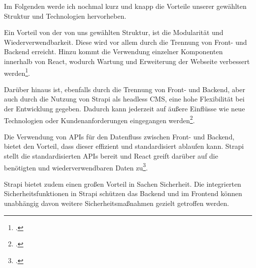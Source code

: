 Im Folgenden werde ich nochmal kurz und knapp die Vorteile unserer gewählten Struktur und Technologien hervorheben.

Ein Vorteil von der von uns gewählten Struktur, ist die Modularität und Wiederverwendbarkeit. Diese wird vor allem durch die Trennung von Front- und Backend erreicht. Hinzu kommt die Verwendung einzelner Komponenten innerhalb von React, wodurch Wartung und Erweiterung der Webseite verbessert werden\footcite{acharya_15_2023}.

Darüber hinaus ist, ebenfalls durch die Trennung von Front- und Backend, aber auch durch die Nutzung von Strapi als headless CMS, eine hohe Flexibilität bei der Entwicklung gegeben. Dadurch kann jederzeit auf äußere Einflüsse wie neue Technologien oder Kundenanforderungen eingegangen werden\footcite{autor_warum_nodate}.

Die Verwendung von APIs für den Datenfluss zwischen Front- und Backend, bietet den Vorteil, dass dieser effizient und standardisiert ablaufen kann. Strapi stellt die standardisierten APIs bereit und React greift darüber auf die benötigten und wiederverwendbaren Daten zu\footcite{autor_headless-cms_nodate}.

Strapi bietet zudem einen großen Vorteil in Sachen Sicherheit. Die integrierten Sicherheitsfunktionen in Strapi schützen das Backend und im Frontend können unabhängig davon weitere Sicherheitsmaßnahmen gezielt getroffen werden.
